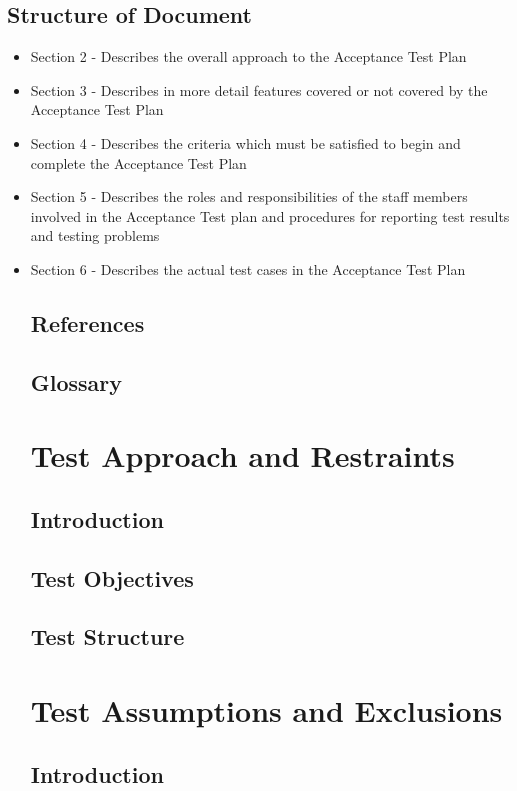 \documentclass{article}
\begin{document}
\subsection{Structure of Document}
\begin{itemize}
  \item Section 2 - Describes the overall approach to the Acceptance
    Test Plan
  \item Section 3 - Describes in more detail features covered
    or not covered by the Acceptance Test Plan
  \item Section 4 - Describes the criteria which must be satisfied to
    begin and complete the Acceptance Test Plan
  \item Section 5 - Describes the roles and responsibilities of the
    staff members involved in the Acceptance Test plan and procedures for
    reporting test results and testing problems
  \item Section 6 - Describes the actual test cases in the Acceptance
    Test Plan


\subsection{References}
\subsection{Glossary}

\section{Test Approach and Restraints}

\subsection{Introduction}
\subsection{Test Objectives}
\subsection{Test Structure}

\section{Test Assumptions and Exclusions}

\subsection{Introduction}

\end{itemize}
\end{document}
